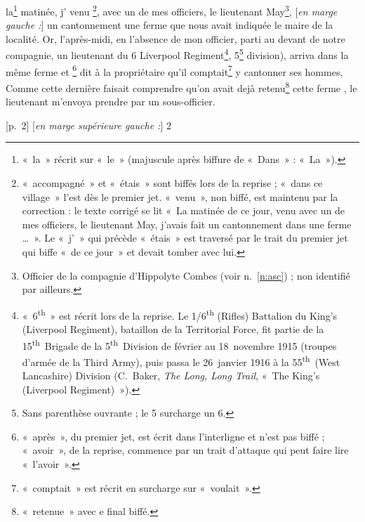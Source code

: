 \begin{LJlettre}
 la\footnote{«~la~» récrit sur «~le~» (majuscule après biffure de «~Dans~» : «~La~»).} matinée,   j'  venu \footnote{«~accompagné~» et «~étais~» sont biffés lors de la reprise ; «~dans ce village~» l'est dès le premier jet. «~venu~», non biffé, est maintenu par la correction : le texte corrigé se lit «~La matinée de ce jour, venu avec un de mes officiers, le lieutenant May, j'avais fait un cantonnement dans une ferme \ldots~». Le «~j'~» qui précède «~étais~» est traversé par le trait du premier jet qui biffe «~de ce jour~» et devait tomber avec lui.}, avec un de mes officiers, le lieutenant May\footnote{Officier de la compagnie d'Hippolyte Combes (voir n.~\ref{n:asc}) ; non identifié par ailleurs.},   [\textit{en marge gauche :}]  un cantonnement   une ferme que nous avait indiquée le maire de la localité. Or, l'après-midi, en l'absence de mon officier, parti au devant de notre compagnie, un lieutenant du 6 Liverpool Regiment\footnote{«~6\textsuperscript{th}~» est récrit lors de la reprise. Le 1/6\textsuperscript{th} (Rifles) Battalion du King's (Liverpool Regiment), bataillon de la Territorial Force, fit partie de la 15\textsuperscript{th}~Brigade de la 5\textsuperscript{th}~Division de février au 18~novembre 1915 (troupes d'armée de la Third Army), puis passa le 26~janvier 1916 à la 55\textsuperscript{th}~(West Lancashire) Division (C.~Baker, \textit{The Long, Long Trail}, «~The King's (Liverpool Regiment)~»).},  5\footnote{Sans parenthèse ouvrante ; le 5 surcharge un 6.} division),  arriva dans la même ferme et \footnote{«~après~», du premier jet, est écrit dans l'interligne et n'est pas biffé ; «~avoir~», de la reprise, commence par un trait d'attaque qui peut faire lire «~l'avoir~».} dit à la propriétaire qu'il \LJdel{\LJill{}} comptait\footnote{«~comptait~» est récrit en surcharge sur «~voulait~».} y cantonner ses hommes, \LJdel{\LJinc{\&}} Comme cette dernière faisait comprendre  qu'on avait dejà retenu\footnote{«~retenue~» avec e final biffé.} cette ferme , le lieutenant m'envoya prendre par un sous-officier.

[p.~2] [\textit{en marge supérieure gauche :}] 2\par\nopagebreak[4]


\end{LJlettre}

